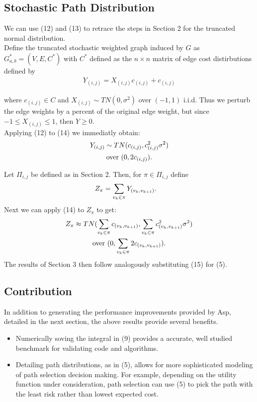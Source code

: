 \documentclass[twocolumn]{article}
\begin{document}
\subsection{Stochastic Path Distribution}
We can use (12) and (13) to retrace the steps in  Section 2 for the truncated normal distribution. \\

Define the truncated stochastic weighted graph induced by $G$ as $G^{\ast}_{a,b} = (V, E,C^{\ast} )$ with $C^{\ast}$  defined as the $n \times n$ matrix of edge cost distirbutions defined by 
\begin{gather}
Y_{(i,j)} = X_{(i,j)}c_{(i,j)} + c_{(i,j)} 
\end{gather}

where $c_{(i,j)} \in C$ and $X_{(i,j)} \sim TN(0,\sigma^{2})$ over $(-1,1)$ i.i.d. Thus we perturb the edge weights by a percent of the original edge weight, but since $-1 \leq X_{(i,j)} \leq 1$, then $Y \geq 0$.\\

Applying (12) to (14) we immediatly obtain:
\begin{gather}
Y_{(i,j)} \sim  TN(c_{(i,j)},c_{(i,j)}^{2}\sigma^{2})\notag\\
\text{over } (0,2c_{(i,j)}). \notag
\end{gather}

Let $\Pi_{i,j}$ be defined as in Section 2. Then, for $\pi \in \Pi_{i,j}$ define
\begin{align}
Z_{\pi} & = \sum_{v_{k} \in \pi} Y_{(v_{k},v_{k+1})}.\notag
\end{align}
Next we can apply (14) to $Z_{\pi}$ to get:
\begin{gather}
Z_{\pi} \approx TN( \sum_{v_{k} \in \pi} c_{(v_{k},v_{k+1})} ,  \sum_{v_{k} \in \pi} c_{(v_{k},v_{k+1})}^{2}\sigma^{2}) \\
\text{over } (0,\sum_{v_{k} \in \pi}  2c_{(v_{k},v_{k+1})}). \notag
\end{gather}
The results of Section 3 then follow analogously substituting (15) for (5).


\subsection{Contribution}
In addition to generating the performance improvements provided by Asp, detailed in the next section, the above results provide several benefits.
\begin{itemize}
\item Numerically soving the integral in (9) provides a accurate, well studied benchmark for validating code and algorithms.
\item Detailing path distributions, as in (5), allows for more sophisticated modeling of path selection decision making. For example, depending on the utility function under consideration, path selection can use (5) to pick the path with the least risk rather than lowest expected cost.
\end{itemize}
\end{document}
